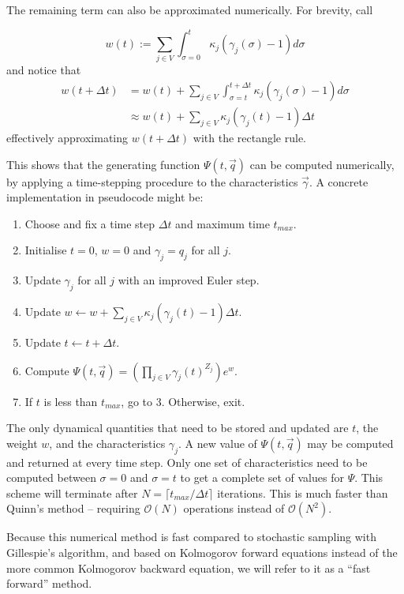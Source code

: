 \documentclass{article}
\begin{document}
The remaining term can also be approximated numerically. For brevity, call

\begin{equation}
    w(t) := {\sum_{j \in V} \int_{\sigma=0}^{t} \kappa_j (\gamma_j(\sigma)-1) d\sigma}
\end{equation}
and notice that
\begin{align}
    w(t + \Delta t)
    &= w(t) +
    \sum_{j \in V} \int_{\sigma=t}^{t + \Delta t} \kappa_j (\gamma_j(\sigma)-1) d\sigma
    \nonumber \\
    &\approx  w(t) + \sum_{j \in V} \kappa_j (\gamma_j(t)-1) \Delta t
\end{align}
effectively approximating $w(t+\Delta t)$ with the rectangle rule.

This shows that the generating function $\Psi(t, \vec{q})$ can be computed
numerically, by applying a time-stepping procedure to the characteristics
$\vec{\gamma}$. A concrete implementation in pseudocode might be:

\begin{enumerate}
    \item Choose and fix a time step $\Delta t$ and maximum time $t_{max}$.
    \item Initialise $t = 0$, $w = 0$ and $\gamma_j = q_j$ for all $j$.
    \item Update $\gamma_j$ for all $j$ with an improved Euler step.
    \item Update $w \leftarrow w + \sum_{j \in V} \kappa_j (\gamma_j(t)-1)
    \Delta t$.
    \item Update $t \leftarrow t + \Delta t$.
    \item Compute $\Psi(t, \vec{q}) = \left(\prod_{j \in V}
    \gamma_j(t)^{Z_j}\right) e^w$.
    \item If $t$ is less than $t_{max}$, go to 3. Otherwise, exit.
\end{enumerate}

The only dynamical quantities that need to be stored and updated are $t$, the
weight $w$, and the
characteristics $\gamma_j$. A new value of $\Psi(t, \vec{q})$ may be computed
and returned at every time step. Only one set of characteristics need to be computed
between $\sigma = 0$ and $\sigma = t$ to get a complete set of values for
$\Psi$. This scheme will terminate after $N = \lceil t_{max} / \Delta t \rceil$
iterations. This is much faster than Quinn's method -- requiring
$\mathcal{O}(N)$ operations instead of $\mathcal{O}(N^2)$.

Because this numerical method is fast compared to stochastic sampling with
Gillespie's algorithm, and based on Kolmogorov forward equations instead of the
more common Kolmogorov backward equation, we will refer to it as a ``fast
forward'' method.
\end{document}
